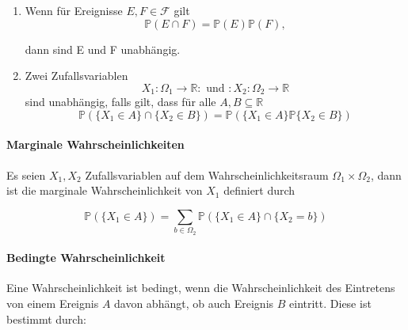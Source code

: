 \begin{Def}

\vspace{5pt}

\begin{enumerate}
	\item Wenn f\"ur Ereignisse $E, F \in \mathcal{F} $ gilt
	\begin{equation} 
	\mathbb{P} (E\cap F)= \mathbb{P} (E)  \mathbb{P} (F),
	\end{equation}

dann sind E und F unabhängig. 

\item Zwei Zufallsvariablen 
\begin{equation*}
X_{1}: \Omega_{1} \rightarrow \mathbb{R} : \text{ und } : X_{2}: \Omega_{2} \rightarrow \mathbb{R}
\end{equation*}
sind unabhängig, falls gilt, dass für alle $A, B \subseteq \mathbb{R}$
\begin{equation*}
\mathbb{P} (\{X_{1} \in A\} \cap \{X_{2} \in B\} ) = \mathbb{P} (\{X_{1} \in A\}  \mathbb{P} \{X_{2} \in B\} )
\end{equation*}
\end{enumerate}
\end{Def}
\vspace{10pt}

\paragraph {Marginale Wahrscheinlichkeiten}

Es seien $X_{1}, X_{2}$ Zufallsvariablen auf dem Wahrscheinlichkeitsraum $\Omega_{1}\times \Omega_{2}$, dann ist die marginale Wahrscheinlichkeit von $X_{1}$ definiert durch 

\begin{equation*}
\mathbb{P} (\{X_{1} \in A \} ) = \sum_{b \in \Omega_{2} } \mathbb{P} (\{X_{1} \in A\} \cap \{X_{2} = b\})
\end{equation*}

\vspace{10pt}

\paragraph {Bedingte Wahrscheinlichkeit}
Eine Wahrscheinlichkeit ist bedingt, wenn die Wahrscheinlichkeit des Eintretens von einem Ereignis $A$ davon abhängt, ob auch Ereignis $B$ eintritt. 
Diese ist bestimmt durch:

